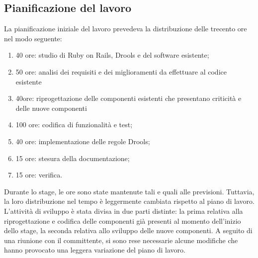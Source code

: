 \subsection{Pianificazione del lavoro}

La pianificazione iniziale del lavoro prevedeva la distribuzione delle trecento ore nel modo seguente:
\begin{enumerate}
	\item	40 ore:     studio di Ruby on Rails, Drools e del software esistente;
	\item	50 ore:		analisi dei requisiti e dei miglioramenti da effettuare al codice esistente
	\item	40ore:		riprogettazione delle componenti esistenti che presentano criticità e delle nuove componenti
	\item	100 ore:     codifica di funzionalità e test;
	\item	40 ore:		implementazione delle regole Drools;
	\item 	15 ore:		 stesura della documentazione;
	\item	15 ore: 	verifica.
\end{enumerate}

%
%


Durante lo stage, le ore sono state mantenute tali e quali alle previsioni. Tuttavia, la loro distribuzione nel tempo è leggermente cambiata rispetto al piano di lavoro. \\
L'attività di sviluppo è stata divisa in due parti distinte:  la prima relativa alla riprogettazione e codifica delle componenti già presenti al momento dell'inizio dello stage, la seconda relativa allo sviluppo delle nuove componenti.
A seguito di una riunione con il committente, si sono rese necessarie alcune modifiche che hanno provocato una leggera variazione del piano di lavoro.\\

